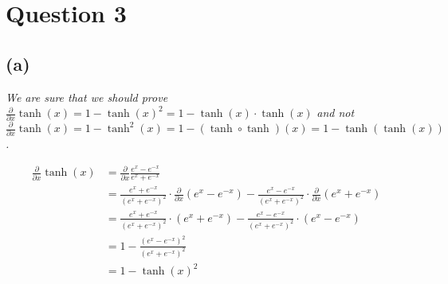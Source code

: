 \section*{Question 3}
\subsection*{(a)}
\textit{We are sure that we should prove} $\frac{\partial}{\partial x} \tanh(x) = 1 - \tanh(x)^2 = 1 - \tanh(x) \cdot \tanh(x)$ \textit{and not} $\frac{\partial}{\partial x} \tanh(x) = 1 - \tanh^2(x) = 1 - (\tanh \circ \tanh)(x) = 1 - \tanh(\tanh(x))$\textit{.}

\begin{align*}
\frac{\partial}{\partial x} \tanh(x) &= \frac{\partial}{\partial x} \frac{e^x - e^{-x}}{e^x + e^{-x}} \\
&= \frac{e^x + e^{-x}}{(e^x + e^{-x})^2} \cdot \frac{\partial}{\partial x} (e^x - e^{-x}) - \frac{e^x - e^{-x}}{(e^x + e^{-x})^2} \cdot \frac{\partial}{\partial x} (e^x + e^{-x}) \\
&= \frac{e^x + e^{-x}}{(e^x + e^{-x})^2} \cdot (e^x + e^{-x}) - \frac{e^x - e^{-x}}{(e^x + e^{-x})^2} \cdot (e^x - e^{-x}) \\
&= 1 - \frac{(e^x - e^{-x})^2}{(e^x + e^{-x})^2} \\
&= 1 - \tanh(x)^2
\end{align*}